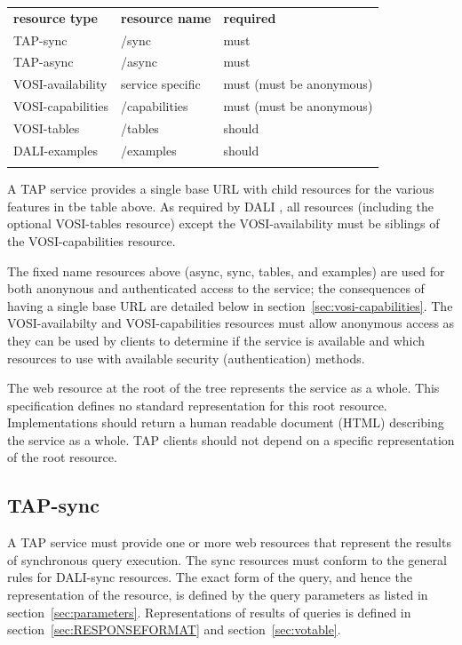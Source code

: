 \documentclass[11pt,letter]{ivoa}
\begin{document}
\medskip
\begin{inlinetable}
\begin{tabular}{l l l}
\sptablerule
\textbf{resource type} & \textbf{resource name} & \textbf{required} \\
\sptablerule
TAP-sync & /sync & must \\
TAP-async & /async & must \\
VOSI-availability & service specific & must (must be anonymous) \\
VOSI-capabilities & /capabilities & must (must be anonymous) \\
VOSI-tables & /tables & should \\
DALI-examples & /examples & should \\
\sptablerule
\end{tabular}
\end{inlinetable}
\medskip

A TAP service provides a single base URL with child resources for the various features in tbe table above. 
As required by DALI \citep{2017ivoa.spec.0517D}, all resources (including the optional VOSI-tables 
resource) except the VOSI-availability must be siblings of the VOSI-capabilities resource.

The fixed name resources above (async, sync, tables, and examples) are used for both anonynous and 
authenticated access to the service; the consequences of having a single base URL are detailed below in 
section~\ref{sec:vosi-capabilities}. The VOSI-availabilty and VOSI-capabilities resources must allow anonymous access as they can be used by clients to determine if the service is available and which resources to use with
available security (authentication) methods.

The web resource at the root of the tree represents the service as a whole. 
This specification defines no standard representation for this root resource. 
Implementations should return a human readable document (HTML) describing 
the service as a whole. TAP clients should not depend on a specific representation 
of the root resource.

\subsection{TAP-sync}
\label{sec:tap-sync}

A TAP service must provide one or more web resources that represent the results 
of synchronous query execution. The {sync} resources must conform to the general rules for
DALI-sync  resources. The exact form of the query, and hence the 
representation of the resource, is defined by the  query parameters as listed in 
section~\ref{sec:parameters}. Representations of results of queries is defined in 
section~\ref{sec:RESPONSEFORMAT} and section~\ref{sec:votable}.
\end{document}
